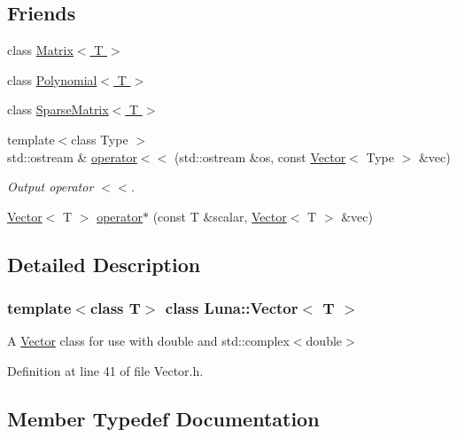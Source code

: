 \subsection*{Friends}
\begin{DoxyCompactItemize}
\item 
class \hyperlink{classLuna_1_1Vector_a17fc06682c9f9c46f1e0e38b7af25b80}{Matrix$<$ T $>$}
\item 
class \hyperlink{classLuna_1_1Vector_abe8021c8bfcc7f40c69097469d597830}{Polynomial$<$ T $>$}
\item 
class \hyperlink{classLuna_1_1Vector_a25dda511be44f42c60e3c7117aac3f2a}{Sparse\+Matrix$<$ T $>$}
\item 
{\footnotesize template$<$class Type $>$ }\\std\+::ostream \& \hyperlink{classLuna_1_1Vector_aa45a6e2bb9fbdb53db42d652a26eaac7}{operator$<$$<$} (std\+::ostream \&os, const \hyperlink{classLuna_1_1Vector}{Vector}$<$ Type $>$ \&vec)
\begin{DoxyCompactList}\small\item\em Output operator $<$$<$. \end{DoxyCompactList}\item 
\hyperlink{classLuna_1_1Vector}{Vector}$<$ T $>$ \hyperlink{classLuna_1_1Vector_a29f70258ec21b100141b45b009416f66}{operator$\ast$} (const T \&scalar, \hyperlink{classLuna_1_1Vector}{Vector}$<$ T $>$ \&vec)
\end{DoxyCompactItemize}


\subsection{Detailed Description}
\subsubsection*{template$<$class T$>$\newline
class Luna\+::\+Vector$<$ T $>$}

A \hyperlink{classLuna_1_1Vector}{Vector} class for use with double and std\+::complex$<$double$>$ 

Definition at line 41 of file Vector.\+h.



\subsection{Member Typedef Documentation}
\mbox{\label{classLuna_1_1Vector_a90cff5eab2782bc1c6aaa879ce18a2b8}} 
